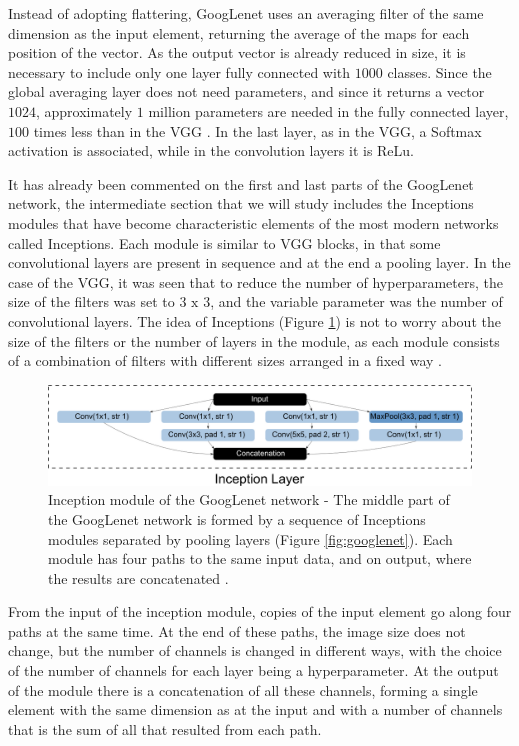 Instead of adopting flattering, GoogLenet uses an averaging filter of the same dimension as the input element, returning the average of the maps for each position of the vector. As the output vector is already reduced in size, it is necessary to include only one layer fully connected with $1000$ classes. Since the global averaging layer does not need parameters, and since it returns a vector $1024$, approximately $1$ million parameters are needed in the fully connected layer, $100$ times less than in the VGG \cite{johnson2019}. In the last layer, as in the VGG, a Softmax activation is associated, while in the convolution layers it is ReLu.

It has already been commented on the first and last parts of the GoogLenet network, the intermediate section that we will study includes the Inceptions modules that have become characteristic elements of the most modern networks called Inceptions. Each module is similar to VGG blocks, in that some convolutional layers are present in sequence and at the end a pooling layer. In the case of the VGG, it was seen that to reduce the number of hyperparameters, the size of the filters was set to $3\text{ x }3$, and the variable parameter was the number of convolutional layers. The idea of Inceptions (Figure \ref{fig:inceptionmodule}) is not to worry about the size of the filters or the number of layers in the module, as each module consists of a combination of filters with different sizes arranged in a fixed way \cite{elgendy2020}.

\begin{figure}
    \centering
    \includegraphics[scale=0.34]{"Part 3 - Learning Systems/Supervised Learning/Deep Learning/images/figure133.png"}
    \caption{ Inception module of the GoogLenet network - The middle part of the GoogLenet network is formed by a sequence of Inceptions modules separated by pooling layers (Figure \ref{fig:googlenet}). Each module has four paths to the same input data, and on output, where the results are concatenated \cite{zhang2020dive}.}
    \label{fig:inceptionmodule}
\end{figure}

From the input of the inception module, copies of the input element go along four paths at the same time. At the end of these paths, the image size does not change, but the number of channels is changed in different ways, with the choice of the number of channels for each layer being a hyperparameter. At the output of the module there is a concatenation of all these channels, forming a single element with the same dimension as at the input and with a number of channels that is the sum of all that resulted from each path.

